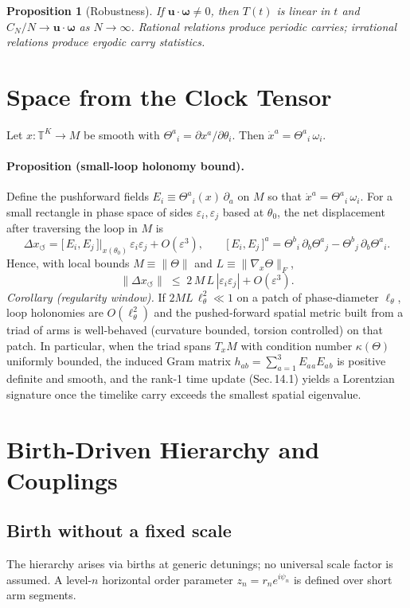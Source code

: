 \documentclass[11pt]{article}
\newtheorem{proposition}{Proposition}
\newcommand{\TT}{\mathbb T}
\newcommand{\vect}[1]{\boldsymbol{#1}}
\begin{document}
\begin{proposition}[Robustness]
If $\vect u\!\cdot\!\vect\omega\ne 0$, then $T(t)$ is linear in $t$ and $C_N/N\to \vect u\!\cdot\!\vect\omega$ as $N\to\infty$. 
Rational relations produce periodic carries; irrational relations produce ergodic carry statistics.
\end{proposition}

\section{Space from the Clock Tensor}
\label{sec:space-clock}
Let $x:\TT^K\to M$ be smooth with $\Theta^a{}_i=\partial x^a/\partial\theta_i$. Then $\dot x^a=\Theta^a{}_i\,\omega_i$.
\paragraph{Proposition (small-loop holonomy bound).}
Define the pushforward fields $E_i \equiv \Theta^a{}_i(x)\,\partial_a$ on $M$ so that 
$\dot x^a=\Theta^a{}_i\,\omega_i$. For a small rectangle in phase space of sides 
$\varepsilon_i,\varepsilon_j$ based at $\theta_0$, the net displacement after traversing the loop 
in $M$ is
\[
\Delta x_{\circlearrowleft}
=\big[\,E_i,E_j\,\big]\Big|_{x(\theta_0)}\,\varepsilon_i\varepsilon_j+O(\varepsilon^3),
\qquad
\big[\,E_i,E_j\,\big]^a
=\Theta^b{}_i\,\partial_b\Theta^a{}_j-\Theta^b{}_j\,\partial_b\Theta^a{}_i.
\]
Hence, with local bounds $M\equiv\|\Theta\|$ and $L\equiv\|\nabla_x\Theta\|_F$,
\[
\|\Delta x_{\circlearrowleft}\|
\;\le\;2\,M\,L\,|\varepsilon_i\varepsilon_j|+O(\varepsilon^3).
\tag{3*}
\]
\emph{Corollary (regularity window).} If $2ML\,\ell_\theta^2\ll 1$ on a patch of phase‑diameter 
$\ell_\theta$, loop holonomies are $O(\ell_\theta^2)$ and the pushed‑forward spatial metric 
built from a triad of arms is well‑behaved (curvature bounded, torsion controlled) on that patch. 
In particular, when the triad spans $T_xM$ with condition number $\kappa(\Theta)$ uniformly bounded, 
the induced Gram matrix $h_{ab}=\sum_{a=1}^3 E_a{}_aE_a{}_b$ is positive definite and smooth, 
and the rank‑1 time update (Sec.\,14.1) yields a Lorentzian signature once the timelike carry 
exceeds the smallest spatial eigenvalue.


\section{Birth-Driven Hierarchy and Couplings}

\subsection{Birth without a fixed scale}
The hierarchy arises via births at generic detunings; no universal scale factor is assumed. A level-$n$ horizontal order parameter $z_n=r_n e^{i\psi_n}$ is defined over short arm segments.
\end{document}
